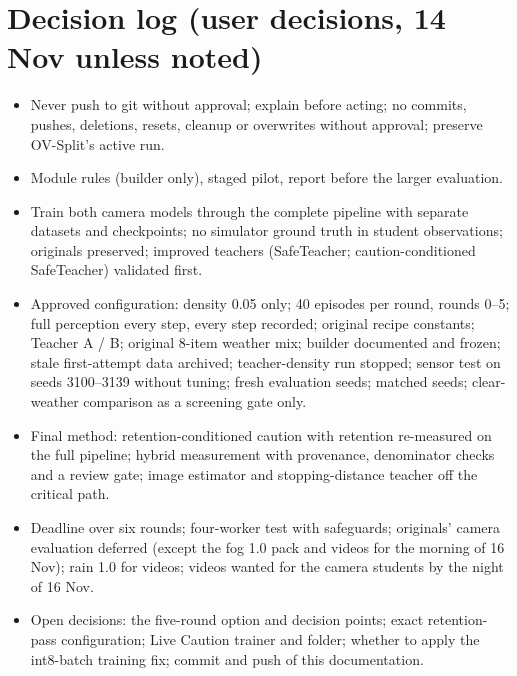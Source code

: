 \documentclass[10.5pt,a4paper]{article}
\begin{document}
\section{Decision log (user decisions, 14 Nov unless noted)}
\begin{itemize}[leftmargin=*]
\item Never push to git without approval; explain before acting; no commits, pushes, deletions, resets, cleanup or overwrites without approval; preserve OV-Split's active run.
\item Module rules (builder only), staged pilot, report before the larger evaluation.
\item Train both camera models through the complete pipeline with separate datasets and checkpoints; no simulator ground truth in student observations; originals preserved; improved teachers (SafeTeacher; caution-conditioned SafeTeacher) validated first.
\item Approved configuration: density 0.05 only; 40 episodes per round, rounds 0--5; full perception every step, every step recorded; original recipe constants; Teacher A / B; original 8-item weather mix; builder documented and frozen; stale first-attempt data archived; teacher-density run stopped; sensor test on seeds 3100--3139 without tuning; fresh evaluation seeds; matched seeds; clear-weather comparison as a screening gate only.
\item Final method: retention-conditioned caution with retention re-measured on the full pipeline; hybrid measurement with provenance, denominator checks and a review gate; image estimator and stopping-distance teacher off the critical path.
\item Deadline over six rounds; four-worker test with safeguards; originals' camera evaluation deferred (except the fog 1.0 pack and videos for the morning of 16 Nov); rain 1.0 for videos; videos wanted for the camera students by the night of 16 Nov.
\item Open decisions: the five-round option and decision points; exact retention-pass configuration; Live Caution trainer and folder; whether to apply the int8-batch training fix; commit and push of this documentation.
\end{itemize}
\end{document}
